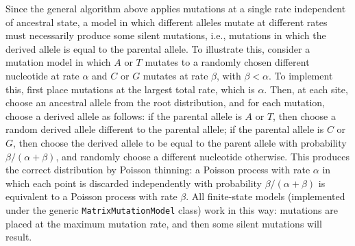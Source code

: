 \documentclass[9pt,twocolumn,twoside,lineno]{gsajnl}
\begin{document}
Since the general algorithm above applies mutations at a single rate
independent of ancestral state,
a model in which different alleles mutate at different rates
must necessarily produce some silent mutations,
i.e., mutations in which the derived allele is equal to the parental allele.
To illustrate this, consider a mutation model
in which $A$ or $T$ mutates to a randomly chosen different nucleotide at rate $\alpha$
and $C$ or $G$ mutates at rate $\beta$, with $\beta < \alpha$.
To implement this, first place mutations at the largest total rate, which is $\alpha$.
Then, at each site, choose an ancestral allele from the root distribution,
and for each mutation, choose a derived allele as follows:
if the parental allele is $A$ or $T$, then choose a random derived allele
different to the parental allele;
if the parental allele is $C$ or $G$,
then choose the derived allele to be equal to the parent allele
with probability $\beta/(\alpha + \beta)$,
and randomly choose a different nucleotide otherwise.
This produces the correct distribution by Poisson thinning:
a Poisson process with rate $\alpha$ in which each point is discarded independently
with probability $\beta / (\alpha + \beta)$ is equivalent to a Poisson
process with rate $\beta$.
All finite-state models (implemented under the generic \texttt{MatrixMutationModel} class)
work in this way: mutations are placed at the maximum mutation rate,
and then some silent mutations will result.
\end{document}

